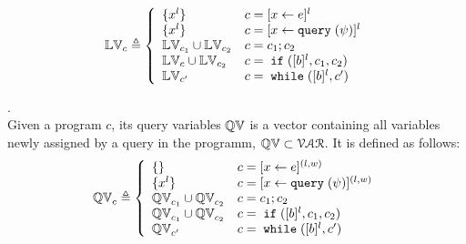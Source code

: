 %
\begin{defn}
$$
  \lvar_{c} \triangleq
  \left\{
  \begin{array}{ll}
      \{{x}^l\}                   
      & {c} = [{\assign x e}]^{l} 
      \\
      \{{x}^l\}                   
      & {c} = [{\assign x \query(\qexpr)}]^{l} 
      \\
      \lvar_{{c_1}} \cup \lvar_{{c_2}}  
      & {c} = {c_1};{c_2}
      \\
      \lvar_{{c}} \cup \lvar_{{c_2}} 
      & {c} =\eif([\bexpr]^{l}, c_1, c_2) 
      \\
      \lvar_{{c}'}
      & {c}   = \ewhile ([\bexpr]^{l}, {c}')
\end{array}
\right.
$$
\end{defn}
%
\begin{defn}.
\\
Given a program $c$, its query variables $\mathbb{QV}$ is a vector containing all variables newly assigned by a query in the programm, $\mathbb{QV} \subset \mathcal{VAR}$.
It is defined as follows:
$$
  \qvar_{{c}} \triangleq
  \left\{
  \begin{array}{ll}
      \{\}                  
      & {c} = [{\assign x e}]^{(l, w)} 
      \\
      \{{x}^l\}                  
      & {c} = [{\assign x \query(\qexpr)}]^{(l, w)} 
      \\
      \qvar_{{c_1}} \cup \qvar_{{c_2}}  
      & {c} = {c_1};{c_2}
      \\
      \qvar_{{c_1}} \cup \qvar_{{c_2}} 
      & {c} =\eif([\bexpr]^{l}, c_1, c_2) 
      \\
      \qvar_{{c}'}
      & {c}   = \ewhile ([\bexpr]^{l}, {c}')
\end{array}
\right.
$$
\end{defn}
%
%
